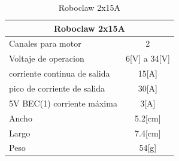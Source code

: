 \documentclass[a4paper]{book}
\begin{document}
\begin{table}[H]
\begin{center}
\begin{tabular}{|l|l|}%


\hline
\multicolumn{2}{|c|}{Roboclaw 2x15A} \\ \hline %
Canales para motor & \multicolumn{1}{|c|}{2}\\ \hline
Voltaje de operacion & \multicolumn{1}{|c|}{6[V] a 34[V]}\\ \hline
corriente continua de salida & \multicolumn{1}{|c|}{15[A]}\\ \hline
pico de corriente de salida & \multicolumn{1}{|c|}{30[A]}\\ \hline
5V BEC(1) corriente máxima & \multicolumn{1}{|c|}{3[A]}\\ \hline
Ancho & \multicolumn{1}{|c|}{5.2[cm]}\\ \hline
Largo & \multicolumn{1}{|c|}{7.4[cm]}\\ \hline
Peso & \multicolumn{1}{|c|}{54[g]}\\ \hline

\end{tabular}
\caption{Roboclaw 2x15A}
\label{Datos del Roboclaw}
\end{center}
\end{table}
\end{document}

